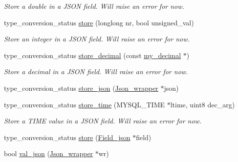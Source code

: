 \begin{DoxyCompactItemize}
\begin{DoxyCompactList}\small\item\em Store a double in a J\+S\+ON field. Will raise an error for now. \end{DoxyCompactList}\item 
\mbox{\label{classField__json_aed2d12d164f33b14f5c085795e47672a}} 
type\+\_\+conversion\+\_\+status \mbox{\hyperlink{classField__json_aed2d12d164f33b14f5c085795e47672a}{store}} (longlong nr, bool unsigned\+\_\+val)
\begin{DoxyCompactList}\small\item\em Store an integer in a J\+S\+ON field. Will raise an error for now. \end{DoxyCompactList}\item 
\mbox{\label{classField__json_a979954944f1ee5334945f83135acdb8e}} 
type\+\_\+conversion\+\_\+status \mbox{\hyperlink{classField__json_a979954944f1ee5334945f83135acdb8e}{store\+\_\+decimal}} (const \mbox{\hyperlink{classmy__decimal}{my\+\_\+decimal}} $\ast$)
\begin{DoxyCompactList}\small\item\em Store a decimal in a J\+S\+ON field. Will raise an error for now. \end{DoxyCompactList}\item 
type\+\_\+conversion\+\_\+status \mbox{\hyperlink{classField__json_a7340a06a3ea62eaab391a9187ab68414}{store\+\_\+json}} (\mbox{\hyperlink{classJson__wrapper}{Json\+\_\+wrapper}} $\ast$json)
\item 
\mbox{\label{classField__json_a5731d3f5f045aa66468f6f9242c920a0}} 
type\+\_\+conversion\+\_\+status \mbox{\hyperlink{classField__json_a5731d3f5f045aa66468f6f9242c920a0}{store\+\_\+time}} (M\+Y\+S\+Q\+L\+\_\+\+T\+I\+ME $\ast$ltime, uint8 dec\+\_\+arg)
\begin{DoxyCompactList}\small\item\em Store a T\+I\+ME value in a J\+S\+ON field. Will raise an error for now. \end{DoxyCompactList}\item 
type\+\_\+conversion\+\_\+status \mbox{\hyperlink{classField__json_a14e5d7ad204fd25768140bff8fa7aafa}{store}} (\mbox{\hyperlink{classField__json}{Field\+\_\+json}} $\ast$field)
\item 
bool \mbox{\hyperlink{classField__json_ad3cb25bf3b17303a553ebbeec77b503c}{val\+\_\+json}} (\mbox{\hyperlink{classJson__wrapper}{Json\+\_\+wrapper}} $\ast$wr)

\end{DoxyCompactItemize}
